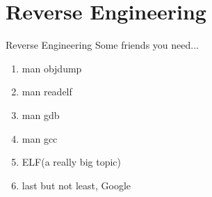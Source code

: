 \documentclass[UKenglish]{beamer}
\begin{document}
\section{Reverse Engineering}
\begin{frame}{Reverse Engineering}
  Some friends you need...
  \begin{enumerate}
  \item man objdump
  \item man readelf
  \item man gdb
  \item man gcc
  \item ELF(a really big topic)
  \item last but not least, Google
  \end{enumerate}
\end{frame}
\end{document}
